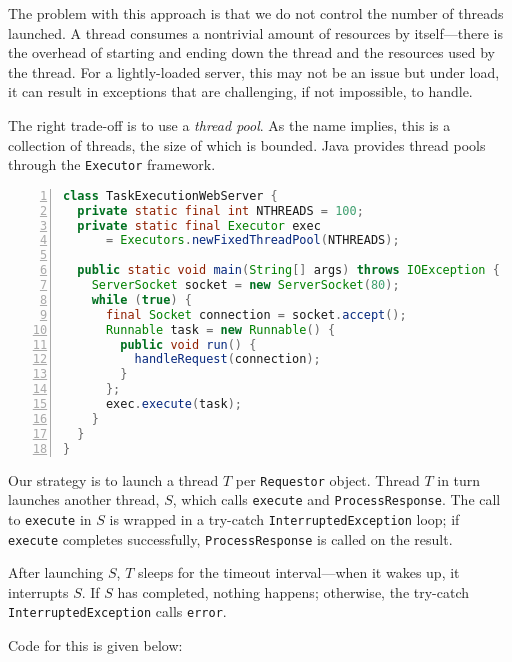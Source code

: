 The problem with this approach is that we do not control the
number of threads launched. A thread consumes a nontrivial
amount of resources by itself---there is the overhead of
starting and ending down the thread and the resources
used by the thread. For a lightly-loaded server,
this may not be an issue but under load, it can result in 
exceptions that are challenging, if not impossible, to handle.

The right trade-off is to use a {\em thread pool}. As the 
name implies, this is a collection of threads, the size of which
is bounded. Java provides thread pools through the \texttt{Executor}
framework. 

\begin{lstlisting}[basicstyle=\footnotesize,numbers=left,breaklines=true,language=Java]
class TaskExecutionWebServer {
  private static final int NTHREADS = 100;
  private static final Executor exec 
      = Executors.newFixedThreadPool(NTHREADS);

  public static void main(String[] args) throws IOException {
    ServerSocket socket = new ServerSocket(80);
    while (true) {
      final Socket connection = socket.accept();
      Runnable task = new Runnable() {
        public void run() {
          handleRequest(connection);
        }
      };
      exec.execute(task);
    }
  }
}
\end{lstlisting}
       
Our strategy is to launch a thread $T$ per \texttt{Requestor} object. 
Thread $T$ in turn launches another thread, $S$, which calls 
\texttt{execute} and \texttt{ProcessResponse}. 
The call to \texttt{execute} in $S$
is wrapped in a try-catch \texttt{InterruptedException} loop;
if \texttt{execute} completes successfully,
\texttt{ProcessResponse} is called on the result.

After launching $S$, $T$ sleeps for the timeout interval---when
it wakes up, it interrupts $S$. If $S$ has completed, nothing happens; otherwise, the try-catch \texttt{InterruptedException} calls \texttt{error}.

Code for this is given below:


\begin{comment}
Send requests, register call-backs.  Responses are asynchronous.
Need to demultiplex messages---unique identifier.
Can have fault-tolerance in the form of time-outs, does not appreciably add
to the overhead.
Need a single thread to manage the demuxing.
\end{comment}

